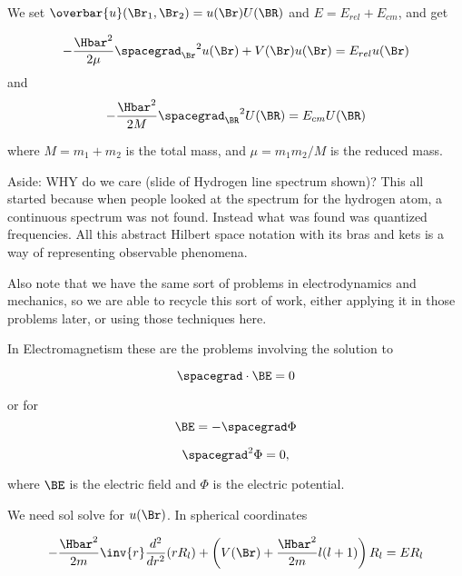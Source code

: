 We set $\overbar{u}(\Br_1, \Br_2) = u(\Br) U(\BR)$ and $E = E_{rel} + E_{cm}$, and get

\begin{equation}\label{eqn:PHY356FLecture10:10}
-\frac{\Hbar^2}{2\mu} {\spacegrad_{\Br}}^2 u(\Br) + V(\Br) u(\Br) = E_{rel} u(\Br)
\end{equation}
and
\begin{equation}\label{eqn:PHY356FLecture10:20}
-\frac{\Hbar^2}{2M} {\spacegrad_{\BR}}^2 U(\BR) = E_{cm} U(\BR)
\end{equation}

where $M = m_1 + m_2$ is the total mass, and $\mu = m_1 m_2/M$ is the reduced mass.

Aside: WHY do we care (slide of Hydrogen line spectrum shown)?  This all started because when people looked at the spectrum for the hydrogen atom, a continuous spectrum was not found.  Instead what was found was quantized frequencies.  All this abstract Hilbert space notation with its bras and kets is a way of representing observable phenomena.

Also note that we have the same sort of problems in electrodynamics and mechanics, so we are able to recycle this sort of work, either applying it in those problems later, or using those techniques here.

In Electromagnetism these are the problems involving the solution to

\begin{equation}\label{eqn:PHY356FLecture10:30}
\spacegrad \cdot \BE = 0
\end{equation}

or for
\begin{equation}\label{eqn:PHY356FLecture10:40}
\BE = - \spacegrad \Phi
\end{equation}


\begin{equation}\label{eqn:PHY356FLecture10:60}
\spacegrad^2 \Phi = 0,
\end{equation}

where $\BE$ is the electric field and $\Phi$ is the electric potential.


We need sol solve  for $u(\Br)$.  In spherical coordinates

\begin{equation}\label{eqn:PHY356FLecture10:70}
-\frac{\Hbar^2}{2m} \inv{r} \frac{d^2}{dr^2} ( r R_l ) + \left( V(\Br) + \frac{\Hbar^2 }{2m} l(l+1) \right) R_l = E R_l
\end{equation}

